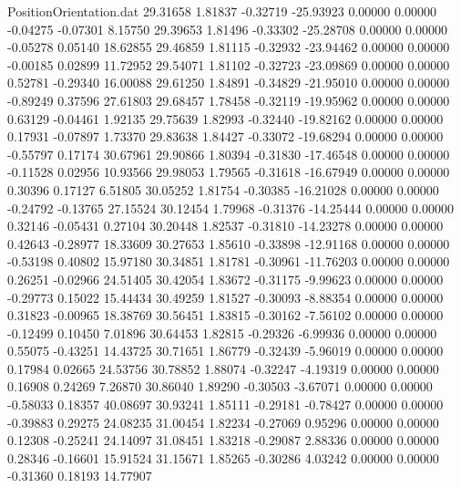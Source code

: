\begin{filecontents}{PositionOrientation.dat}
  29.31658    1.81837   -0.32719   -25.93923    0.00000    0.00000   -0.04275   -0.07301    8.15750
  29.39653    1.81496   -0.33302   -25.28708    0.00000    0.00000   -0.05278    0.05140   18.62855
  29.46859    1.81115   -0.32932   -23.94462    0.00000    0.00000   -0.00185    0.02899   11.72952
  29.54071    1.81102   -0.32723   -23.09869    0.00000    0.00000    0.52781   -0.29340   16.00088
  29.61250    1.84891   -0.34829   -21.95010    0.00000    0.00000   -0.89249    0.37596   27.61803
  29.68457    1.78458   -0.32119   -19.95962    0.00000    0.00000    0.63129   -0.04461    1.92135
  29.75639    1.82993   -0.32440   -19.82162    0.00000    0.00000    0.17931   -0.07897    1.73370
  29.83638    1.84427   -0.33072   -19.68294    0.00000    0.00000   -0.55797    0.17174   30.67961
  29.90866    1.80394   -0.31830   -17.46548    0.00000    0.00000   -0.11528    0.02956   10.93566
  29.98053    1.79565   -0.31618   -16.67949    0.00000    0.00000    0.30396    0.17127    6.51805
  30.05252    1.81754   -0.30385   -16.21028    0.00000    0.00000   -0.24792   -0.13765   27.15524
  30.12454    1.79968   -0.31376   -14.25444    0.00000    0.00000    0.32146   -0.05431    0.27104
  30.20448    1.82537   -0.31810   -14.23278    0.00000    0.00000    0.42643   -0.28977   18.33609
  30.27653    1.85610   -0.33898   -12.91168    0.00000    0.00000   -0.53198    0.40802   15.97180
  30.34851    1.81781   -0.30961   -11.76203    0.00000    0.00000    0.26251   -0.02966   24.51405
  30.42054    1.83672   -0.31175    -9.99623    0.00000    0.00000   -0.29773    0.15022   15.44434
  30.49259    1.81527   -0.30093    -8.88354    0.00000    0.00000    0.31823   -0.00965   18.38769
  30.56451    1.83815   -0.30162    -7.56102    0.00000    0.00000   -0.12499    0.10450    7.01896
  30.64453    1.82815   -0.29326    -6.99936    0.00000    0.00000    0.55075   -0.43251   14.43725
  30.71651    1.86779   -0.32439    -5.96019    0.00000    0.00000    0.17984    0.02665   24.53756
  30.78852    1.88074   -0.32247    -4.19319    0.00000    0.00000    0.16908    0.24269    7.26870
  30.86040    1.89290   -0.30503    -3.67071    0.00000    0.00000   -0.58033    0.18357   40.08697
  30.93241    1.85111   -0.29181    -0.78427    0.00000    0.00000   -0.39883    0.29275   24.08235
  31.00454    1.82234   -0.27069     0.95296    0.00000    0.00000    0.12308   -0.25241   24.14097
  31.08451    1.83218   -0.29087     2.88336    0.00000    0.00000    0.28346   -0.16601   15.91524
  31.15671    1.85265   -0.30286     4.03242    0.00000    0.00000   -0.31360    0.18193   14.77907

\end{filecontents}
